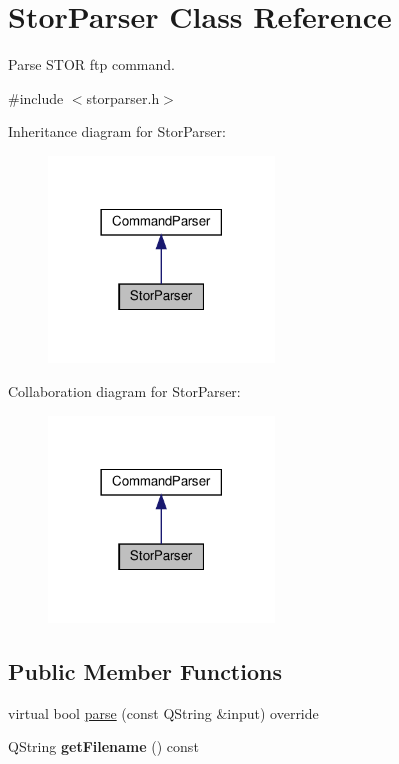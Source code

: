\hypertarget{classStorParser}{}\section{Stor\+Parser Class Reference}
\label{classStorParser}


Parse S\+T\+OR ftp command.  




{\ttfamily \#include $<$storparser.\+h$>$}



Inheritance diagram for Stor\+Parser\+:\nopagebreak
\begin{figure}[H]
\begin{center}
\leavevmode
\includegraphics[width=170pt]{d8/ddf/classStorParser__inherit__graph}
\end{center}
\end{figure}


Collaboration diagram for Stor\+Parser\+:\nopagebreak
\begin{figure}[H]
\begin{center}
\leavevmode
\includegraphics[width=170pt]{de/d6b/classStorParser__coll__graph}
\end{center}
\end{figure}
\subsection*{Public Member Functions}
\begin{DoxyCompactItemize}
\item 
virtual bool \hyperlink{classStorParser_a3b268c187eaf7135971fb553e9d10cf3}{parse} (const Q\+String \&input) override
\item 
\mbox{\label{classStorParser_af34fcbfc89879aeb37032cceb4389556}} 
Q\+String {\bfseries get\+Filename} () const
\end{DoxyCompactItemize}


